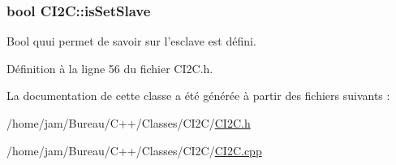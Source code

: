 \hypertarget{class_c_i2_c_a19200c12efe17b560256641cce4f5909}{
\subsubsection[{is\+Set\+Slave}]{\setlength{\rightskip}{0pt plus 5cm}bool C\+I2\+C\+::is\+Set\+Slave\hspace{0.3cm}{\ttfamily [private]}}}\label{class_c_i2_c_a19200c12efe17b560256641cce4f5909}


Bool quui permet de savoir sur l'esclave est défini. 



Définition à la ligne 56 du fichier C\+I2\+C.\+h.



La documentation de cette classe a été générée à partir des fichiers suivants \+:\begin{DoxyCompactItemize}
\item 
/home/jam/\+Bureau/\+C++/\+Classes/\+C\+I2\+C/\hyperlink{_c_i2_c_8h}{C\+I2\+C.\+h}\item 
/home/jam/\+Bureau/\+C++/\+Classes/\+C\+I2\+C/\hyperlink{_c_i2_c_8cpp}{C\+I2\+C.\+cpp}\end{DoxyCompactItemize}
